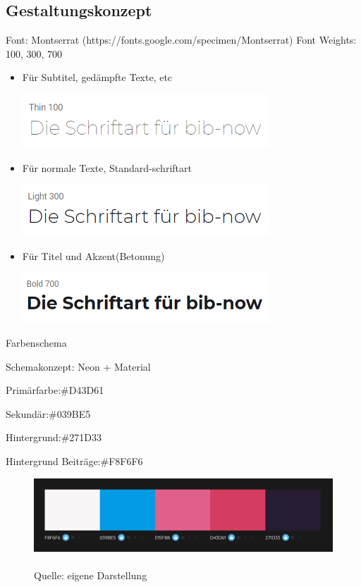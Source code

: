 \documentclass[12pt,titlepage]{article}
\begin{document}
\newpage
\subsection{Gestaltungskonzept}

Font: Montserrat (https://fonts.google.com/specimen/Montserrat)
Font Weights: 100, 300, 700
\vspace{2cm}
\begin{itemize}
\item
	Für Subtitel, gedämpfte Texte, etc

\includegraphics{images/Schriftart_100.png}
\item
	Für normale Texte, Standard-schriftart

\includegraphics{images/Schriftart_300.png}
\item
	Für Titel und Akzent(Betonung)

\includegraphics{images/Schriftart_700.png}
\end{itemize}


Farbenschema

Schemakonzept: Neon + Material

Primärfarbe:\#D43D61

Sekundär:\#039BE5

Hintergrund:\#271D33

Hintergrund Beiträge:\#F8F6F6

\begin{figure}[hbt!]
\centering
\includegraphics[width=400pt]{images/Schema_1.png}
\caption[Farbenschema]{\\Quelle: eigene Darstellung}
\end{figure}
\end{document}
